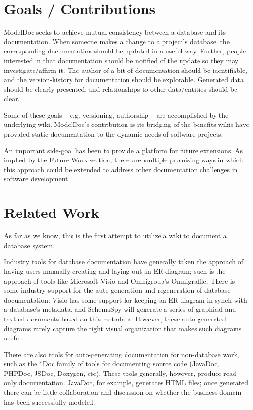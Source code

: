 \documentclass[nocopyrightspace]{acm_proc_article-sp}
\begin{document}
\section{Goals / Contributions}

ModelDoc seeks to achieve mutual consistency between a database and its
documentation.  When someone makes a change to a project's database, the
corresponding documentation should be updated in a useful way.  Further, people
interested in that documentation should be notified of the update so they may
investigate/affirm it.  The author of a bit of documentation should be
identifiable, and the version-history for documentation should be explorable. 
Generated data should be clearly presented, and relationships to other
data/entities should be clear.

Some of these goals -- e.g. versioning, authorship -- are accomplished by the
underlying wiki.  ModelDoc's contribution is its bridging of the benefits
wikis have provided static documentation to the dynamic needs of software
projects.

An important side-goal has been to provide a platform for future extensions. 
As implied by the Future Work section, there are multiple promising ways in
which this approach could be extended to address other documentation challenges
in software development.

\section{Related Work}
As far as we know, this is the first attempt to utilize a wiki to document a
database system.

Industry tools for database documentation have generally taken the approach of
having users manually creating and laying out an ER diagram; such is
the approach of tools like Microsoft Visio and Omnigroup's Omnigraffle.  There
is some industry support for the auto-generation and regeneration of database
documentation: Visio has some support for keeping an ER diagram in synch with a
database's metadata, and SchemaSpy will generate a series of graphical and
textual documents based on this metadata. However, these auto-generated
diagrams rarely capture the right visual organization that makes such diagrams
useful.

There are also tools for auto-generating documentation for non-database work,
such as the *Doc family of tools for documenting source code (JavaDoc, PHPDoc,
JSDoc, Doxygen, etc).  These tools generally, however, produce read-only
documentation.  JavaDoc, for example, generates HTML files; once generated
there can be little collaboration and discussion on whether the business domain
has been successfully modeled.
\end{document}
